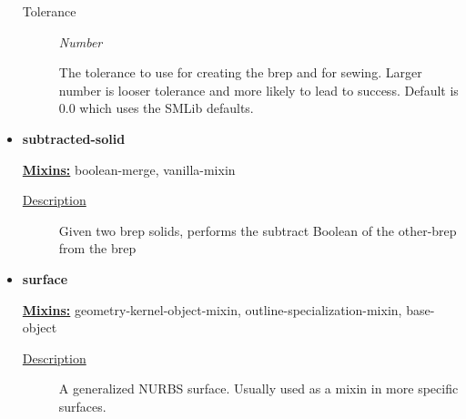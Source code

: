 \documentclass [11pt]{book}
\begin{document}
\begin{itemize}
\begin{description}
\item [Tolerance]
\emph{Number}

 The tolerance to use for creating the brep and for sewing. Larger number is looser tolerance
and more likely to lead to success. Default is 0.0 which uses the SMLib defaults.




\end{description}







\item {}
\label{prim:subtracted-solid}
\textbf{subtracted-solid}


\textbf{
\underline{Mixins:}} boolean-merge, vanilla-mixin





\begin{description}

\item [
\underline{Description}]


Given two brep solids, performs the subtract Boolean of the other-brep from the brep



\end{description}









\item {}
\label{prim:surface}
\textbf{surface}


\textbf{
\underline{Mixins:}} geometry-kernel-object-mixin, outline-specialization-mixin, base-object





\begin{description}

\item [
\underline{Description}]


A generalized NURBS surface. 
Usually used as a mixin in more specific surfaces.



\end{description}









\end{itemize}
\end{document}
